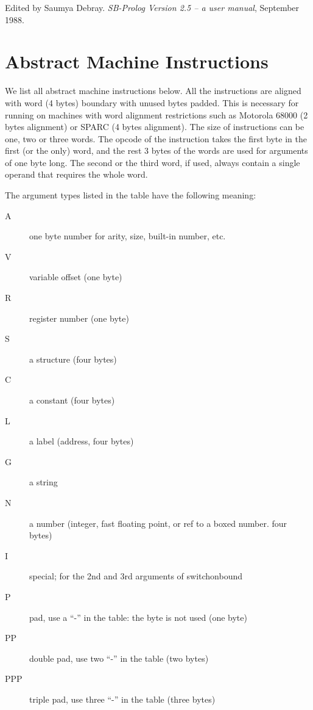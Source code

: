 \documentclass[11pt]{article}
\begin{document}
\begin{thebibliography}{[8]}
	Edited by Saumya Debray. {\it SB-Prolog Version 2.5 -- a user manual},
	September 1988.
\end{thebibliography}

\newpage

\appendix

\section		{Abstract Machine Instructions}

We list all abstract machine instructions below. All the instructions
are aligned with word (4 bytes) boundary with unused bytes padded.
This is necessary for running on machines with word alignment
restrictions such as Motorola 68000 (2 bytes alignment) or SPARC (4
bytes alignment). The size of instructions can be one, two or three
words. The opcode of the instruction takes the first byte in the first
(or the only) word, and the rest 3 bytes of the words are used for
arguments of one byte long. The second or the third word, if used,
always contain a single operand that requires the whole word.  

The
argument types listed in the table have the following meaning:

\begin{description}
  \item[A] one byte number for arity, size, built-in number, etc.
  \item[V] variable offset (one byte)
  \item[R] register number (one byte)
  \item[S] a structure (four bytes)
  \item[C] a constant (four bytes)
  \item[L] a label (address, four bytes)
  \item[G] a string
  \item[N] a number (integer, fast floating point, or ref to a boxed number. four bytes)
  \item[I] special; for the 2nd and 3rd arguments of switchonbound
  \item[P] pad, use a ``-'' in the table: the byte is not used (one byte)
  \item[PP] double pad, use two ``-'' in the table (two bytes)
  \item[PPP] triple pad, use three ``-'' in the table (three bytes)
\end{description}
\end{document}
